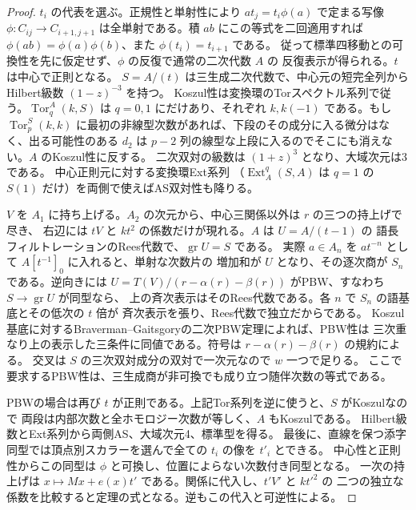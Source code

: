 \begin{proof}
$t_i$ の代表を選ぶ。正規性と単射性により $a t_j=t_i\phi(a)$ で定まる写像
$\phi:C_{ij}\to C_{i+1,j+1}$ は全単射である。積 $ab$ にこの等式を二回適用すれば
$\phi(ab)=\phi(a)\phi(b)$、また $\phi(t_i)=t_{i+1}$ である。
従って標準四移動との可換性を先に仮定せず、$\phi$ の反復で通常の二次代数 $A$ の
反復表示が得られる。$t$ は中心で正則となる。
$S=A/(t)$ は三生成二次代数で、中心元の短完全列からHilbert級数 $(1-z)^{-3}$ を持つ。
Koszul性は変換環のTorスペクトル系列で従う。$\operatorname{Tor}^A_q(k,S)$ は
$q=0,1$ にだけあり、それぞれ $k,k(-1)$ である。もし $\operatorname{Tor}^S_p(k,k)$
に最初の非線型次数があれば、下段のその成分に入る微分はなく、出る可能性のある
$d_2$ は $p-2$ 列の線型な上段に入るのでそこにも消えない。$A$ のKoszul性に反する。
二次双対の級数は $(1+z)^3$ となり、大域次元は3である。
中心正則元に対する変換環Ext系列
（$\operatorname{Ext}^q_A(S,A)$ は $q=1$ の $S(1)$ だけ）を両側で使えばAS双対性も降りる。

$V$ を $A_1$ に持ち上げる。$A_2$ の次元から、中心三関係以外は $r$ の三つの持上げで尽き、
右辺には $tV$ と $kt^2$ の係数だけが現れる。$A$ は $U=A/(t-1)$ の
語長フィルトレーションのRees代数で、$\operatorname{gr} U=S$ である。
実際 $a\in A_n$ を $a t^{-n}$ として $A[t^{-1}]_0$ に入れると、単射な次数片の
増加和が $U$ となり、その逐次商が $S_n$ である。逆向きには
$U=T(V)/(r-\alpha(r)-\beta(r))$ がPBW、すなわち $S\to\operatorname{gr} U$ が同型なら、
上の斉次表示はそのRees代数である。各 $n$ で $S_n$ の語基底とその低次の $t$ 倍が
斉次表示を張り、Rees代数で独立だからである。
Koszul基底に対するBraverman--Gaitsgoryの二次PBW定理によれば、PBW性は
三次重なり上の表示した三条件に同値である。符号は $r-\alpha(r)-\beta(r)$ の規約による。
交叉は $S$ の三次双対成分の双対で一次元なので $w$ 一つで足りる。
ここで要求するPBW性は、三生成商が非可換でも成り立つ随伴次数の等式である。

PBWの場合は再び $t$ が正則である。上記Tor系列を逆に使うと、$S$ がKoszulなので
両段は内部次数と全ホモロジー次数が等しく、$A$ もKoszulである。
Hilbert級数とExt系列から両側AS、大域次元4、標準型を得る。
最後に、直線を保つ添字同型では頂点別スカラーを選んで全ての $t_i$ の像を $t'_i$ とできる。
中心性と正則性からこの同型は $\phi$ と可換し、位置によらない次数付き同型となる。
一次の持上げは $x\mapsto Mx+e(x)t'$ である。関係に代入し、$t'V'$ と $kt'^2$ の
二つの独立な係数を比較すると定理の式となる。逆もこの代入と可逆性による。
\end{proof}

